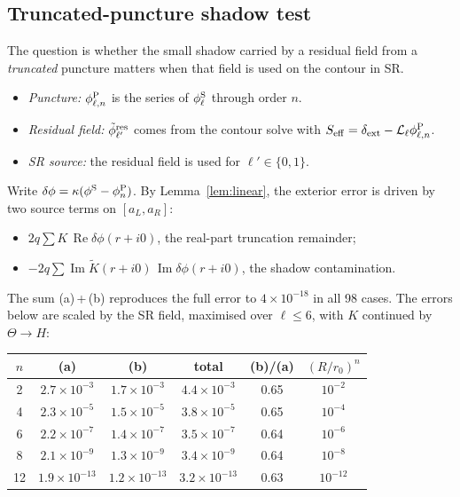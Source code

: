 \documentclass[11pt,a4paper]{article}
\renewcommand{\Re}{\operatorname{Re}}
\renewcommand{\Im}{\operatorname{Im}}
\newcommand{\dext}{\delta_{\rm ext}}
\newcommand{\Lop}{\mathcal{L}_\ell}
\newcommand{\phiS}{\phi^{\rm S}}
\begin{document}
\subsection{Truncated-puncture shadow test}\label{sec:shadowtest}
The question is whether the small shadow carried by a residual field from a \emph{truncated} puncture matters when that field is used on the contour in SR.
\begin{itemize}[nosep]
\item \emph{Puncture:} $\phi^{\rm P}_{\ell,n}$ is the series of $\phiS_\ell$ through order $n$.
\item \emph{Residual field:} $\tilde\phi^{\rm res}_{\ell'}$ comes from the contour solve with $S_{\rm eff}=\dext-\Lop\phi^{\rm P}_{\ell,n}$.
\item \emph{SR source:} the residual field is used for $\ell'\in\{0,1\}$.
\end{itemize}
Write $\delta\phi=\kappa(\phiS-\phi^{\rm P}_n)$.
By Lemma~\ref{lem:linear}, the exterior error is driven by two source terms on $[a_L,a_R]$:
\begin{itemize}[nosep]
\item[(a)] $2q\sum K\,\Re\delta\phi(r+i0)$, the real-part truncation remainder;
\item[(b)] $-2q\sum\Im\tilde K(r+i0)\,\Im\delta\phi(r+i0)$, the shadow contamination.
\end{itemize}
The sum (a)\,+\,(b) reproduces the full error to $4\times10^{-18}$ in all 98 cases.
The errors below are scaled by the SR field, maximised over $\ell\le6$, with $K$ continued by $\Theta\to H$:
\begin{center}
\small
\renewcommand{\arraystretch}{1.2}
\begin{tabular}{@{}cccccc@{}}
\toprule
$n$ & (a) & (b) & total & (b)/(a) & $(R/r_0)^n$\\
\midrule
2 & $2.7\times10^{-3}$ & $1.7\times10^{-3}$ & $4.4\times10^{-3}$ & 0.65 & $10^{-2}$\\
4 & $2.3\times10^{-5}$ & $1.5\times10^{-5}$ & $3.8\times10^{-5}$ & 0.65 & $10^{-4}$\\
6 & $2.2\times10^{-7}$ & $1.4\times10^{-7}$ & $3.5\times10^{-7}$ & 0.64 & $10^{-6}$\\
8 & $2.1\times10^{-9}$ & $1.3\times10^{-9}$ & $3.4\times10^{-9}$ & 0.64 & $10^{-8}$\\
12 & $1.9\times10^{-13}$ & $1.2\times10^{-13}$ & $3.2\times10^{-13}$ & 0.63 & $10^{-12}$\\
\bottomrule
\end{tabular}
\end{center}
\end{document}
